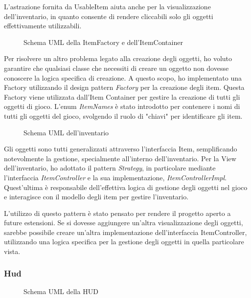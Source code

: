 \documentclass[a4paper,12pt]{report}
\begin{document}
L'astrazione fornita da UsableItem aiuta anche per la visualizzazione dell'inventario, in quanto consente di rendere cliccabili solo gli oggetti effettivamente utilizzabili.

\begin{figure}[H]
	\centering
	
	\caption{Schema UML della ItemFactory e dell'ItemContainer}
	\label{fig:the-exiled-itemFactory_itemContainer-uml}
\end{figure}

Per risolvere un altro problema legato alla creazione degli oggetti, ho voluto garantire che qualsiasi classe che necessiti di creare un oggetto non dovesse conoscere la logica specifica di creazione. A questo scopo, ho implementato una Factory utilizzando il design pattern \textit{Factory} per la creazione degli item. Questa Factory viene utilizzata dall'Item Container per gestire la creazione di tutti gli oggetti di gioco. L'enum \textit{ItemNames} è stato introdotto per contenere i nomi di tutti gli oggetti del gioco, svolgendo il ruolo di "chiavi" per identificare gli item.

\begin{figure}[H]
	\centering
	
	\caption{Schema UML dell'inventario}
	\label{fig:the-exiled-inventory-uml}
\end{figure}

Gli oggetti sono tutti generalizzati attraverso l'interfaccia Item, semplificando notevolmente la gestione, specialmente all'interno dell'inventario. Per la View dell'inventario, ho adottato il pattern \textit{Strategy}, in particolare mediante l'interfaccia \textit{ItemController} e la sua implementazione, \textit{ItemControllerImpl}. Quest'ultima è responsabile dell'effettiva logica di gestione degli oggetti nel gioco e interagisce con il modello degli item per gestire l'inventario.

L'utilizzo di questo pattern è stato pensato per rendere il progetto aperto a future estensioni. Se si dovesse aggiungere un'altra visualizzazione degli oggetti, sarebbe possibile creare un'altra implementazione dell'interfaccia ItemController, utilizzando una logica specifica per la gestione degli oggetti in quella particolare vista.
\subsubsection{Hud}
\begin{figure}[H]
	\centering
	
	\caption{Schema UML della HUD}
	\label{fig:the-exiled-hud-uml}
\end{figure}
\end{document}
